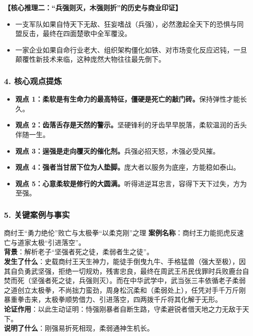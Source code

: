 \noindent\textbf{【核心推理二：“兵强则灭，木强则折”的历史与商业印证】}
\begin{itemize}
    \item 一支军队如果自恃天下无敌、狂妄嗜战（兵强），必然激起全天下的恐惧与同盟反击，最终在四面楚歌中全军覆没。
    \item 一家企业如果自命行业老大、组织架构僵化如铁、对市场变化反应迟钝，一旦颠覆性新技术来临，这种庞然大物往往最先倒下。
\end{itemize}

\subsubsection{4. 核心观点提炼}
\begin{itemize}
    \item \textbf{观点 1：柔软是有生命力的最高特征，僵硬是死亡的敲门砖。}保持弹性才能长久。
    \item \textbf{观点 2：齿落舌存是天然的警示。}坚硬锋利的牙齿早早脱落，柔软温润的舌头伴随一生。
    \item \textbf{观点 3：逞强是走向覆灭的催化剂。}兵强必招天怒，木强必受风摧。
    \item \textbf{观点 4：强者当甘居下位为人垫脚。}庞大者以服务为底座，方能稳如泰山。
    \item \textbf{观点 5：心意柔软是修行的大圆满。}听得进逆耳忠言，容得下天下过失，方为至强。
\end{itemize}

\subsubsection{5. 关键案例与事实}
\begin{CaseBox}{商纣王“勇力绝伦”败亡与太极拳“以柔克刚”之理}
\textbf{案例名称}：商纣王力能扼虎反速亡与道家太极“引进落空”。\\
\textbf{背景}：解析老子“坚强者死之徒，柔弱者生之徒”。\\
\textbf{发生了什么}：史载商纣王天生神力，能徒手倒曳九牛、手格猛兽（强大至极），因其自负勇武坚强，拒绝一切规劝，残害忠良，最终在周武王吊民伐罪时兵败鹿台自焚而死（坚强者死之徒，兵强则灭）。而在中华武学中，武当张三丰依循老子柔弱之道创立太极拳，不尚拙力蛮劲，周身松沉柔和（柔弱处上），任凭对手千万斤刚暴重拳击来，太极拳顺势借力、引进落空，四两拨千斤将其化解于无形。\\
\textbf{论证作用}：以此生动证明：恃强刚暴者自断生路，守柔避锐者借天地之力无敌于天下。\\
\textbf{说明了什么}：刚强易折死相现，柔弱通神生机长。
\end{CaseBox}

